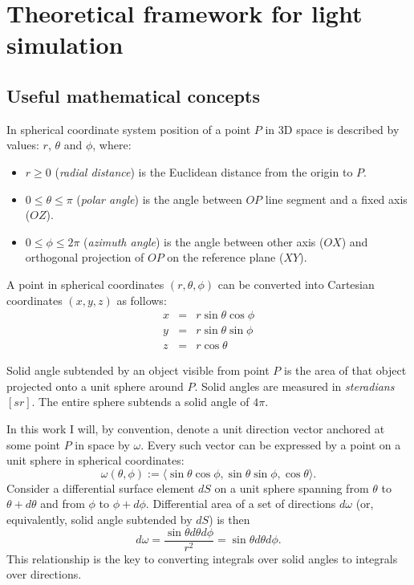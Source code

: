 \chapter{Theoretical framework for light simulation}
\label{ch:theory}

\section{Useful mathematical concepts}

\begin{df}
In spherical coordinate system position of a point $P$ in 3D space is described by values: $r$, $\theta$ and $\phi$, where:
\begin{itemize}
\item $r \geq 0$ (\emph{radial distance}) is the Euclidean distance from the origin to $P$.
\item $0 \leq \theta \leq \pi$ (\emph{polar angle}) is the angle between $OP$ line segment and a fixed axis ($OZ$).
\item $0 \leq \phi \leq 2\pi$ (\emph{azimuth angle}) is the angle between other axis ($OX$) and orthogonal projection of $OP$ on the reference plane ($XY$).
\end{itemize}
A point in spherical coordinates $(r, \theta, \phi)$ can be converted into Cartesian coordinates $(x, y, z)$ as follows:
\begin{eqnarray}
  x &=& r \sin \theta \cos \phi \nonumber \\
  y &=& r \sin \theta \sin \phi \\
  z &=& r \cos \theta \nonumber
\end{eqnarray}
\end{df}

\begin{df}
Solid angle subtended by an object visible from point $P$ is the area of that object projected onto a unit sphere around $P$. Solid angles are measured in \emph{steradians} $[sr]$. The entire sphere subtends a solid angle of $4\pi$.
\end{df}

In this work I will, by convention, denote a unit direction vector anchored at some point $P$ in space by $\omega$. Every such vector can be expressed by a point on a unit sphere in spherical coordinates:
\begin{equation}
  \omega(\theta,\phi) := \langle \sin\theta\cos\phi, \sin\theta\sin\phi, \cos\theta \rangle.
\end{equation}
Consider a differential surface element $dS$ on a unit sphere spanning from $\theta$ to $\theta + d\theta$ and from $\phi$ to $\phi + d\phi$. Differential area of a set of directions $d\omega$ (or, equivalently, solid angle subtended by $dS$) is then
\begin{equation}
\label{eq:dw2spherical}
  d\omega = \frac{\sin\theta d\theta d\phi}{r^{2}} = \sin\theta d\theta d\phi.
\end{equation}
This relationship is the key to converting integrals over solid angles to integrals over directions.

